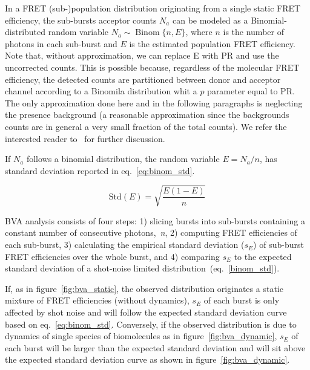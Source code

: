 In a FRET (sub-)population distribution originating from a single static FRET efficiency,
the sub-bursts acceptor counts $N_a$ can be modeled as a Binomial-distributed random variable 
$N_a \sim \operatorname{Binom} \{n, E\}$, where $n$ is the number of photons in each sub-burst and 
$E$ is the estimated population FRET efficiency. Note that, without approximation, we can replace 
E with PR and use the uncorrected counts. This is possible because, regardless of the 
molecular FRET efficiency, the detected counts are partitioned between donor and acceptor channel
according to a Binomila distribution whit a $p$ parameter equal to PR.
The only approximation done here and in the following paragraphs is neglecting the presence background
(a reasonable approximation since the backgrounds counts are in general a very small fraction of
the total counts). 
We refer the interested reader to~\cite{Torella_2011} for further discussion.

If $N_a$ follows a binomial distribution, the random variable $E = N_a/n$,
has standard deviation reported in eq.~\ref{eq:binom_std}. 

\begin{equation}
\label{eq:binom_std}
\operatorname{Std(\textit{E})} = {\sqrt{\frac{E(1 - E)}{n}}}
\end{equation}

BVA analysis consists of four steps: 1) slicing bursts into sub-bursts containing a constant number of consecutive photons,~\textit{n}, 2) computing FRET efficiencies of each sub-burst, 3) calculating the empirical standard deviation ($s_E$) of sub-burst FRET efficiencies over the whole burst, and 4) comparing $s_E$ to the expected standard deviation of a shot-noise limited distribution~(eq.~\ref{binom_std}). 

If, as in figure~\ref{fig:bva_static}, the observed distribution originates a static mixture 
of FRET efficiencies (without dynamics), 
$s_E$ of each burst is only affected by shot noise and will follow the expected standard deviation curve based on eq.~\ref{eq:binom_std}. Conversely, if the observed distribution is due to dynamics of single species of biomolecules as in figure~\ref{fig:bva_dynamic}, $s_E$ of each burst will be larger than the expected standard deviation and will sit above the expected standard deviation curve as shown in figure~\ref{fig:bva_dynamic}.
